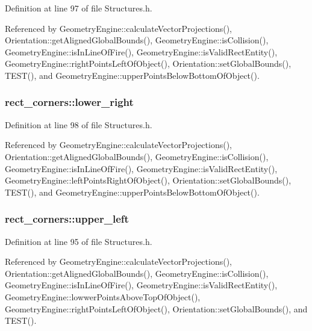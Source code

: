 Definition at line 97 of file Structures.\-h.



Referenced by Geometry\-Engine\-::calculate\-Vector\-Projections(), Orientation\-::get\-Aligned\-Global\-Bounds(), Geometry\-Engine\-::is\-Collision(), Geometry\-Engine\-::is\-In\-Line\-Of\-Fire(), Geometry\-Engine\-::is\-Valid\-Rect\-Entity(), Geometry\-Engine\-::right\-Points\-Left\-Of\-Object(), Orientation\-::set\-Global\-Bounds(), T\-E\-S\-T(), and Geometry\-Engine\-::upper\-Points\-Below\-Bottom\-Of\-Object().

\hypertarget{structrect__corners_aa499428b9c692d61e1b43d059156a5af}{
\subsubsection[{lower\-\_\-right}]{ rect\-\_\-corners\-::lower\-\_\-right}}\label{structrect__corners_aa499428b9c692d61e1b43d059156a5af}


Definition at line 98 of file Structures.\-h.



Referenced by Geometry\-Engine\-::calculate\-Vector\-Projections(), Orientation\-::get\-Aligned\-Global\-Bounds(), Geometry\-Engine\-::is\-Collision(), Geometry\-Engine\-::is\-In\-Line\-Of\-Fire(), Geometry\-Engine\-::is\-Valid\-Rect\-Entity(), Geometry\-Engine\-::left\-Points\-Right\-Of\-Object(), Orientation\-::set\-Global\-Bounds(), T\-E\-S\-T(), and Geometry\-Engine\-::upper\-Points\-Below\-Bottom\-Of\-Object().

\hypertarget{structrect__corners_a48cd191550e65bd24a7d8018c7eefd53}{
\subsubsection[{upper\-\_\-left}]{ rect\-\_\-corners\-::upper\-\_\-left}}\label{structrect__corners_a48cd191550e65bd24a7d8018c7eefd53}


Definition at line 95 of file Structures.\-h.



Referenced by Geometry\-Engine\-::calculate\-Vector\-Projections(), Orientation\-::get\-Aligned\-Global\-Bounds(), Geometry\-Engine\-::is\-Collision(), Geometry\-Engine\-::is\-In\-Line\-Of\-Fire(), Geometry\-Engine\-::is\-Valid\-Rect\-Entity(), Geometry\-Engine\-::lowwer\-Points\-Above\-Top\-Of\-Object(), Geometry\-Engine\-::right\-Points\-Left\-Of\-Object(), Orientation\-::set\-Global\-Bounds(), and T\-E\-S\-T().

